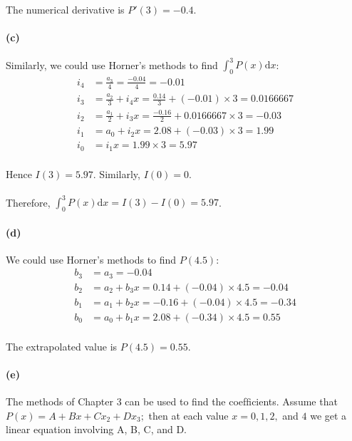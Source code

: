 \documentclass{article}  %
\begin{document}
        \paragraph{}The numerical derivative is $P'(3) = -0.4$.
        \paragraph{(c)}Similarly, we could use Horner's methods to find $\int_0^3 P(x)\mathrm{d}x$:
        \begin{align*}
            i_4 &= \frac{a_3}{4} = \frac{-0.04}{4} = -0.01\\
            i_3 &= \frac{a_2}{3} + i_4x = \frac{0.14}{3} + (-0.01) \times 3 = 0.0166667\\
            i_2 &= \frac{a_1}{2} + i_3x = \frac{-0.16}{2} + 0.0166667 \times 3 = -0.03\\
            i_1 &= a_0 + i_2x = 2.08 + (-0.03) \times 3 = 1.99\\
            i_0 &= i_1x = 1.99 \times 3 = 5.97
        \end{align*}
        \paragraph{}Hence $I(3) = 5.97$. Similarly, $I(0) = 0$.
        \paragraph{}Therefore, $\int_0^3 P(x)\mathrm{d}x = I(3) - I(0) = 5.97$.
        \paragraph{(d)}We could use Horner's methods to find $P(4.5)$:
        \begin{align*}
            b_3 &= a_3 = -0.04\\
            b_2 &= a_2 + b_3x = 0.14 + (-0.04) \times 4.5 = -0.04\\
            b_1 &= a_1 + b_2x = -0.16 + (-0.04) \times 4.5 = -0.34\\
            b_0 &= a_0 + b_1x = 2.08 + (-0.34) \times 4.5 = 0.55
        \end{align*}
        \paragraph{}The extrapolated value is $P(4.5) = 0.55$.
        \paragraph{(e)}The methods of Chapter 3 can be used to ﬁnd the coefﬁcients. Assume that $P(x) = A + Bx + Cx_2 + Dx_3;$ then at each value $x = 0, 1, 2,$ and $4$ we get a linear equation involving A, B, C, and D.
\end{document}
